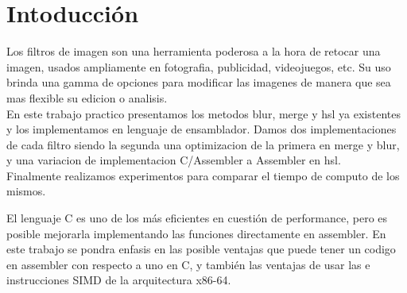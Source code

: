 \documentclass[a4paper]{article}
\begin{document}
\thispagestyle{empty}

\maketitle
\newpage


\vspace{3cm}
\tableofcontents
\thispagestyle{empty}

\newpage

\setcounter{page}{1}

\section{Intoducción}

Los filtros de imagen son una herramienta poderosa a la hora de retocar una imagen, usados ampliamente en fotografia, publicidad, videojuegos, etc.
Su uso brinda una gamma de opciones para modificar las imagenes de manera que sea mas flexible su edicion o analisis.\\
En este trabajo practico presentamos los metodos blur, merge y hsl ya existentes y los implementamos en lenguaje de ensamblador.
Damos dos implementaciones de cada filtro siendo la segunda una optimizacion de la primera en merge y blur, y una variacion de implementacion C/Assembler a Assembler en hsl.\\
Finalmente realizamos experimentos para comparar el tiempo de computo de los mismos.
 
El lenguaje C es uno de los más eficientes en cuestión de performance, pero es posible mejorarla implementando las funciones directamente en assembler. En este trabajo se pondra enfasis en las posible ventajas que puede tener un codigo en assembler con respecto a uno en C, y también las ventajas de usar las e instrucciones SIMD de la arquitectura x86-64.
\end{document}
